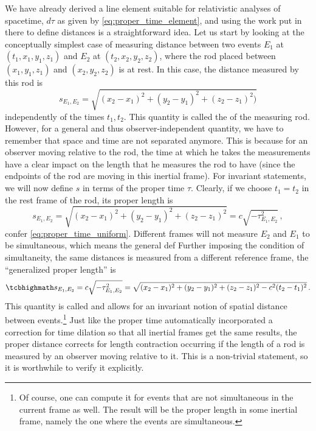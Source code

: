 \documentclass[ART_main.tex]{subfiles}
\begin{document}
We have already derived a line element suitable for relativistic analyses of spacetime, $d\tau$ as given by \eqref{eq:proper_time_element}, and using the work put in there to define distances is a straightforward idea. Let us start by looking at the conceptually simplest case of measuring distance between two events $E_1$ at $(t_1, x_1, y_1, z_1)$ and $E_2$ at $(t_2, x_2, y_2, z_2)$, where the rod placed between $(x_1, y_1, z_1)$ and $(x_2, y_2, z_2)$ is at rest. In this case, the distance measured by this rod is
\begin{equation}\label{eq:proper_length}
	s_{E_1, E_2} = \sqrt{(x_2 - x_1)^2 + (y_2 - y_1)^2 + (z_2 - z_1)^2)}
\end{equation}
independently of the times $t_1, t_2$. This quantity is called the  of the measuring rod. However, for a general and thus observer-independent quantity, we have to remember that space and time are not separated anymore. This is because for an observer moving relative to the rod, the time at which he takes the measurements have a clear impact on the length that he measures the rod to have (since the endpoints of the rod are moving in this inertial frame). For invariant statements, we will now define $s$ in terms of the proper time $\tau$. Clearly, if we choose $t_1 = t_2$ in the rest frame of the rod, its proper length is
\begin{equation*}
	s_{E_1, E_2} = \sqrt{(x_2 - x_1)^2 + (y_2 - y_1)^2 + (z_2 - z_1)^2} = c \sqrt{- \tau_{E_1, E_2}^2} \, ,
\end{equation*}
confer \eqref{eq:proper_time_uniform}. Different frames will not measure $E_2$ and $E_1$ to be simultaneous, which means the general def Further imposing the condition of simultaneity, the same distances is measured from a different reference frame, the \enquote{generalized proper length} is
\begin{equation}\label{eq:proper_distance_uniform}
	\eqbox{
	s_{E_1, E_2} = c \sqrt{- \tau_{E_1, E_2}^2} = \sqrt{(x_2 - x_1)^2 + (y_2 - y_1)^2 + (z_2 - z_1)^2 - c^2 (t_2 - t_1)^2}
	}\, .
\end{equation}
This quantity is called  and allows for an invariant notion of spatial distance between events.\footnote{Of course, one can compute it for events that are not simultaneous in the current frame as well. The result will be the proper length in some inertial frame, namely the one where the events are simultaneous.} Just like the proper time automatically incorporated a correction for time dilation so that all inertial frames get the same results, the proper distance corrects for length contraction occurring if the length of a rod is measured by an observer moving relative to it. This is a non-trivial statement, so it is worthwhile to verify it explicitly.
\end{document}
